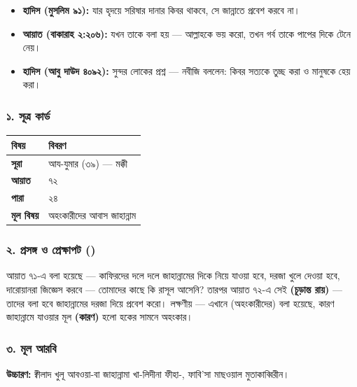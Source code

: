 \begin{itemize}
\item \textbf{হাদিস (মুসলিম ৯১):} যার হৃদয়ে সরিষার দানার কিবর থাকবে, সে জান্নাতে প্রবেশ করবে না।
\item \textbf{আয়াত (বাকারাহ ২:২০৬):} যখন তাকে বলা হয় — আল্লাহকে ভয় করো, তখন গর্ব তাকে পাপের দিকে টেনে নেয়।
\item \textbf{হাদিস (আবু দাউদ ৪০৯২):} সুন্দর লোকের প্রশ্ন — নবীজি বললেন: কিবর সত্যকে তুচ্ছ করা ও মানুষকে হেয় করা।
\end{itemize}
\subsubsection*{১. সূত্র কার্ড}

\begin{table}[h]\centering\small
\begin{tabular}{ll}
বিষয় & বিবরণ \\
\hline
\textbf{সূরা} & আয-যুমার (৩৯) — মক্কী \\
\textbf{আয়াত} & ৭২ \\
\textbf{পারা} & ২৪ \\
\textbf{মূল বিষয়} & অহংকারীদের আবাস জাহান্নাম \\
\hline
\end{tabular}
\end{table}

\subsubsection*{২. প্রসঙ্গ ও প্রেক্ষাপট ()}

আয়াত ৭১-এ বলা হয়েছে — কাফিরদের দলে দলে জাহান্নামের দিকে নিয়ে যাওয়া হবে, দরজা খুলে দেওয়া হবে, দারোয়ানরা জিজ্ঞেস করবে — তোমাদের কাছে কি রাসূল আসেনি? তারপর আয়াত ৭২-এ সেই \textbf{  (চূড়ান্ত রায়)} — তাদের বলা হবে জাহান্নামের দরজা দিয়ে প্রবেশ করো। লক্ষণীয় — এখানে  (অহংকারীদের) বলা হয়েছে, কারণ জাহান্নামে যাওয়ার মূল \textbf{ (কারণ)} হলো হকের সামনে অহংকার।

\subsubsection*{৩. মূল আরবি}
\begin{center}\end{center}
\textbf{উচ্চারণ:} ক্বীলাদ খুলূ আবওয়া-বা জাহান্নামা খা-লিদীনা ফীহা-, ফাবি'সা মাছওয়াল মুতাকাব্বিরীন।

